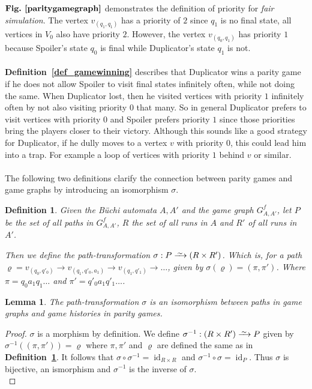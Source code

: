 \documentclass[12pt,oneside,bibliography=totoc,abstracton]{scrartcl}
\newcommand{\ito}{\xrightarrow{\,\smash{\raisebox{-0.45ex}{\ensuremath{\scriptstyle\sim}}}\,}}
\newcommand{\figref}[1]{\textbf{Fig.~\ref{#1}}}
\newcommand{\defref}[1]{\textbf{Definition~\ref{#1}}}
\newtheorem{mydef}{Definition}
\newtheorem{mylemma}{Lemma}
\begin{document}
$\figref{paritygamegraph}$ demonstrates the definition of priority for \textit{fair simulation}. The vertex $v_{(q_1, q_1)}$
has a priority of $2$ since $q_1$ is no final state, all vertices in $V_0$ also have priority $2$.
However, the vertex $v_{(q_0, q_1)}$ has priority $1$ because Spoiler's state
$q_0$ is final while Duplicator's state $q_1$ is not.\\\\
\defref{def_gamewinning} describes that Duplicator wins a parity game if he does not allow Spoiler to visit
final states infinitely often, while not doing the same. When Duplicator lost, then he visited vertices with
priority $1$ infinitely often by not also visiting priority $0$ that many.
So in general Duplicator prefers to visit vertices with priority $0$ and Spoiler prefers priority $1$ since those priorities bring
the players closer to their victory. Although this sounds like a good strategy for Duplicator, if he dully moves to a vertex $v$
with priority $0$, this could lead him into a trap. For example a loop of vertices with priority $1$ behind $v$ or similar.\\\\
The following two definitions clarify the connection between parity games and game graphs
by introducing an isomorphism $\sigma$.
\begin{mydef}\label{def_isomorphism}
	Given the Büchi automata $A, A'$ and the game graph $G^f_{A, A'}$, let $P$
	be the set of all \textnormal{paths} in $G^f_{A, A'}$, $R$ the set of all \textnormal{runs} in
	$A$ and $R'$ of all \textnormal{runs} in $A'$.
	
	Then we define the \textnormal{path-transformation} $\sigma: P \ito (R \times R')$.
	Which is, for a path $\varrho = v_{(q_0, q'_0)} \rightarrow v_{(q_1, q'_0, a_1)}
	\rightarrow v_{(q_1, q'_1)} \rightarrow \ldots$, given by
	$\sigma(\varrho) = (\pi, \pi')$. Where $\pi = q_0a_1q_1 \ldots$ and $\pi' = q'_0a_1q'_1 \ldots$.
\end{mydef}
\begin{mylemma}
	The \textnormal{path-transformation} $\sigma$ is an \textnormal{isomorphism} between
	paths in game graphs and game histories in parity games.
\end{mylemma}
\begin{proof}
	$\sigma$ is a morphism by definition. We define $\sigma^{-1} : (R \times R') \ito P$ given
	by $\sigma^{-1}((\pi, \pi')) = \varrho$ where $\pi, \pi'$ and $\varrho$ are defined the
	same as in \defref{def_isomorphism}. It follows that $\sigma \circ \sigma^{-1} = \operatorname{id}_{R \times R}$
	and $\sigma^{-1} \circ \sigma = \operatorname{id}_P$. Thus $\sigma$ is bijective, an ismorphism and $\sigma^{-1}$
	is the inverse of $\sigma$.\\
\end{proof}\quad\\
\end{document}
